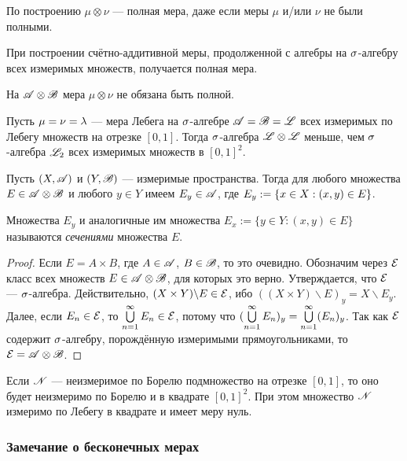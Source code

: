 \documentclass[10pt]{article}
\begin{document}
По построению $\mu\otimes\nu$ --- полная мера, даже если меры $\mu$
и/или $\nu$ не были полными.

\begin{note}
При построении счётно-аддитивной меры, продолженной с алгебры на
$\sigma$-алгебру всех измеримых множеств, получается полная мера.
\end{note}
На $\mathscr{A}\otimes\mathscr{B}$ мера $\mu\otimes\nu$ не обязана быть полной.

\begin{ex}
Пусть $\mu=\nu=\lambda$ --- мера Лебега на $\sigma$-алгебре $\mathscr{A}=\mathscr{B}=\mathscr{L}$
всех измеримых по Лебегу множеств на отрезке $[0,1]$. Тогда
$\sigma$-алгебра $\mathscr{L}\otimes\mathscr{L}$ меньше, чем $\sigma$-алгебра $\mathscr{L}_2$ всех
измеримых множеств в $[0,1]^2$.
\end{ex}

\begin{lemma}
Пусть $(X,\mathscr{A})$ и $(Y,\mathscr{B})$ --- измеримые пространства. Тогда для
любого множества $E\in\mathscr{A}\otimes\mathscr{B}$ и любого $y\in Y$ имеем
$E_y\in\mathscr{A}$, где $E_y:\bw =\{x\in X: (x,y)\in E\}$.
\end{lemma}

\begin{note}
Множества $E_y$ и аналогичные им множества $E_x:=\{y\in Y: (x,y)\in
E\}$ называются \emph{сечениями} множества $E$.
\end{note}

\begin{proof}
Если $E=A\times B$, где $A\in\mathscr{A}$, $B\in\mathscr{B}$, то это очевидно.
Обозначим через $\mathcal{E}$ класс всех множеств $E\in \mathscr{A}\otimes\mathscr{B}$, для
которых это верно. Утверждается, что $\mathcal{E}$ --- $\sigma$-алгебра.
Действительно, $(X\times Y)\backslash E\in\mathcal{E}$, ибо $((X\times
Y)\backslash E)_y=X\backslash E_y$. Далее, если $E_n\in\mathcal{E}$, то
$\bigcup\limits_{n=1}^{\infty} E_n\in\mathcal{E}$, потому что $(\cupnui E_n)_y\bw =\cupnui
(E_n)_y$. Так как $\mathcal{E}$ содержит $\sigma$-алгебру, порождённую
измеримыми прямоугольниками, то $\Ec\bw =\As\otimes\Bs$.
\end{proof}

\begin{imp}
Если $\mathscr{N}$ --- неизмеримое по Борелю подмножество на отрезке
$[0,1]$, то оно будет неизмеримо по Борелю и в квадрате $[0,1]^2$.
При этом множество $\mathscr{N}$ измеримо по Лебегу в квадрате и имеет меру
нуль.
\end{imp}

\subsubsection{Замечание о бесконечных мерах} \label{infty_measures}
\end{document}
